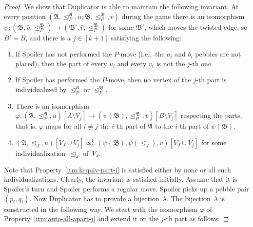 \documentclass[]{lmcs}
\renewcommand{\phi}{\varphi}
\newcommand{\autoA}{\phi}
\newcommand{\autoB}{\psi}
\newcommand{\tup}[1]{\bar{#1}}
\newcommand{\vertA}{u}
\newcommand{\vertB}{v}
\newcommand{\StructA}{\mathfrak{A}}
\newcommand{\StructB}{\mathfrak{B}}
\newcommand{\StructVA}{A}
\newcommand{\StructVB}{B}
\newcommand{\gamebij}{\lambda}
\newcommand{\kequiv}[1]{\simeq^#1_{\mathcal{C}}}
\newcommand{\indRel}{\trianglelefteq}
\begin{document}
\begin{proof}
	We show that
	Duplicator is able to maintain the following invariant.
	At every position ${(\StructA, \indRel_P^\StructA, \tup{\vertA}; \StructB, \indRel_P^\StructB, \tup{\vertB})}$ during the game there is  an isomorphism $\autoB \colon (\StructB, \tup{\vertB}, \indRel_P^\StructB) \to (\StructB', \tup{\vertB}, \indRel_P^\StructB)$ for some $\StructB'$,
	which moves the twisted edge, so $\StructVB' = \StructVB$,
	and there is a $j \in[k+1]$
	satisfying the following:
	\begin{enumerate}
		\item \label{itm:not-p-move} If Spoiler has not performed the $P$-move (i.e.,~the $a_i$ and $b_i$ pebbles are not placed), then the part of every $\vertA_i$ and every $\vertB_i$
		is not the $j$-th one.
		\item \label{itm:p-move} If Spoiler has performed the $P$-move, then
		no vertex of the $j$-th part is individualized by $\indRel_P^\StructA$ or $\indRel_P^\StructB$.
		\item \label{itm:auto-all-apart-j} There is an isomorphism
		$\autoA \colon (\StructA, \indRel_P^\StructA, \tup{\vertA})[\StructVA \setminus V_j] \to 
		 (\autoB(\StructB), \indRel_P^\StructB, \tup{\vertB})[\StructVB \setminus V_j]$ respecting the parts,
		 that is, $\autoA$ maps for all $i\neq j$ the $i$-th part of $\StructA$ 
		 to the $i$-th part of $\autoB(\StructB)$.
		 \item \label{itm:kequiv-part-j}
		 $(\StructA,\indRel_J, \tup{\vertA})[V_J \cup V_j] \kequiv{k}
		 (\autoB(\StructB),\autoB(\indRel_J), \tup{\vertB})[V_J \cup V_j]$ for some individualization~$\indRel_J$ of~$V_J$.
	\end{enumerate}
	Note that Property~\ref{itm:kequiv-part-j} is satisfied either by none or all such individualizations.
	Clearly, the invariant is satisfied initially.
	Assume that it is Spoiler's turn and
	Spoiler performs a regular move.
	Spoiler picks up a pebble pair $(p_i, q_i)$.
	Now Duplicator has to provide a bijection~$\gamebij$.
	The bijection~$\gamebij$ is constructed in the following way.
	We start with the isomorphism $\autoA$ of Property~\ref{itm:auto-all-apart-j} and extend it
	on the $j$-th part as follows:
	

\end{proof}
\end{document}
